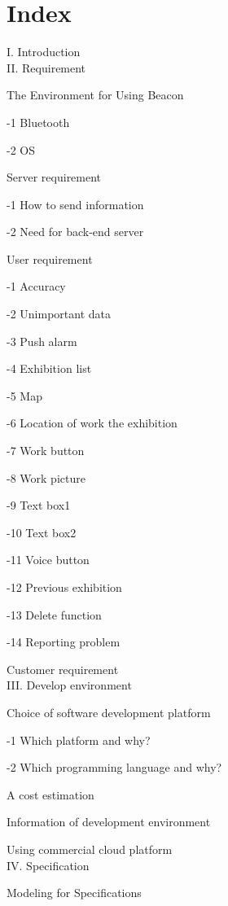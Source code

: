 \documentclass[conference]{IEEEtran}
\begin{document}
\section{Index}

I. Introduction\\


II. Requirement

 The Environment for Using Beacon

-1 Bluetooth 

-2 OS

 Server requirement

-1 How to send information 

-2 Need for back-end server

 User requirement 

-1 Accuracy

-2 Unimportant data 

-3 Push alarm

-4 Exhibition list

-5 Map

-6 Location of work the exhibition 

-7 Work button

-8 Work picture

-9 Text box1

-10 Text box2

-11 Voice button

-12 Previous exhibition

-13 Delete function

-14 Reporting problem

 Customer requirement\\

III. Develop environment

 Choice of software development platform

-1 Which platform and why?

-2 Which programming language and why?

 A cost estimation

 Information of development environment

 Using commercial cloud platform\\

IV. Specification

 Modeling for Specifications 
\end{document}
